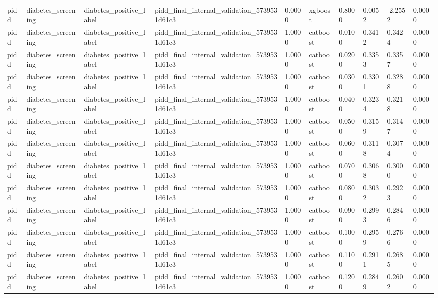 \begin{tabular}{llllllllll}
pidd & diabetes\_screening & diabetes\_positive\_label & pidd\_final\_internal\_validation\_5739531d61c3 & 0.0000 & xgboost & 0.8000 & 0.0052 & -2.2552 & 0.0000 \\
pidd & diabetes\_screening & diabetes\_positive\_label & pidd\_final\_internal\_validation\_5739531d61c3 & 1.0000 & catboost & 0.0100 & 0.3412 & 0.3424 & 0.0000 \\
pidd & diabetes\_screening & diabetes\_positive\_label & pidd\_final\_internal\_validation\_5739531d61c3 & 1.0000 & catboost & 0.0200 & 0.3353 & 0.3357 & 0.0000 \\
pidd & diabetes\_screening & diabetes\_positive\_label & pidd\_final\_internal\_validation\_5739531d61c3 & 1.0000 & catboost & 0.0300 & 0.3301 & 0.3288 & 0.0000 \\
pidd & diabetes\_screening & diabetes\_positive\_label & pidd\_final\_internal\_validation\_5739531d61c3 & 1.0000 & catboost & 0.0400 & 0.3234 & 0.3218 & 0.0000 \\
pidd & diabetes\_screening & diabetes\_positive\_label & pidd\_final\_internal\_validation\_5739531d61c3 & 1.0000 & catboost & 0.0500 & 0.3159 & 0.3147 & 0.0000 \\
pidd & diabetes\_screening & diabetes\_positive\_label & pidd\_final\_internal\_validation\_5739531d61c3 & 1.0000 & catboost & 0.0600 & 0.3118 & 0.3074 & 0.0000 \\
pidd & diabetes\_screening & diabetes\_positive\_label & pidd\_final\_internal\_validation\_5739531d61c3 & 1.0000 & catboost & 0.0700 & 0.3068 & 0.3000 & 0.0000 \\
pidd & diabetes\_screening & diabetes\_positive\_label & pidd\_final\_internal\_validation\_5739531d61c3 & 1.0000 & catboost & 0.0800 & 0.3032 & 0.2923 & 0.0000 \\
pidd & diabetes\_screening & diabetes\_positive\_label & pidd\_final\_internal\_validation\_5739531d61c3 & 1.0000 & catboost & 0.0900 & 0.2993 & 0.2846 & 0.0000 \\
pidd & diabetes\_screening & diabetes\_positive\_label & pidd\_final\_internal\_validation\_5739531d61c3 & 1.0000 & catboost & 0.1000 & 0.2959 & 0.2766 & 0.0000 \\
pidd & diabetes\_screening & diabetes\_positive\_label & pidd\_final\_internal\_validation\_5739531d61c3 & 1.0000 & catboost & 0.1100 & 0.2911 & 0.2685 & 0.0000 \\
pidd & diabetes\_screening & diabetes\_positive\_label & pidd\_final\_internal\_validation\_5739531d61c3 & 1.0000 & catboost & 0.1200 & 0.2849 & 0.2602 & 0.0000 \\

\end{tabular}
